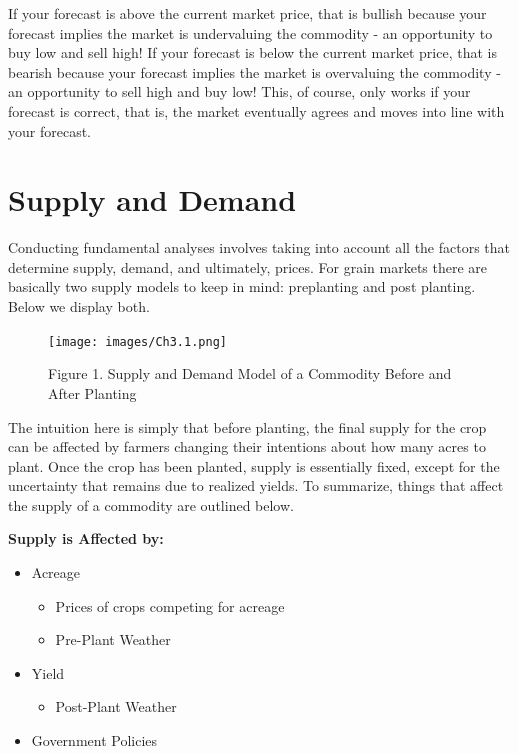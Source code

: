 \documentclass[
]{book}
\providecommand{\tightlist}{%
  \setlength{\itemsep}{0pt}\setlength{\parskip}{0pt}}
\begin{document}
If your forecast is above the current market price, that is bullish because your forecast implies the market is undervaluing the commodity - an opportunity to buy low and sell high! If your forecast is below the current market price, that is bearish because your forecast implies the market is overvaluing the commodity - an opportunity to sell high and buy low! This, of course, only works if your forecast is correct, that is, the market eventually agrees and moves into line with your forecast.

\hypertarget{supply-and-demand}{%
\section{Supply and Demand}\label{supply-and-demand}}

Conducting fundamental analyses involves taking into account all the factors that determine supply, demand, and ultimately, prices. For grain markets there are basically two supply models to keep in mind: preplanting and post planting. Below we display both.

\begin{figure}
\centering
\texttt{[image: images/Ch3.1.png]}
\caption{Figure 1. Supply and Demand Model of a Commodity Before and After Planting}
\end{figure}

The intuition here is simply that before planting, the final supply for the crop can be affected by farmers changing their intentions about how many acres to plant. Once the crop has been planted, supply is essentially fixed, except for the uncertainty that remains due to realized yields. To summarize, things that affect the supply of a commodity are outlined below.

\textbf{Supply is Affected by:}

\begin{itemize}
\tightlist
\item
  Acreage

  \begin{itemize}
  \tightlist
  \item
    Prices of crops competing for acreage
  \item
    Pre-Plant Weather
  \end{itemize}
\item
  Yield

  \begin{itemize}
  \tightlist
  \item
    Post-Plant Weather
  \end{itemize}
\item
  Government Policies
\end{itemize}
\end{document}
